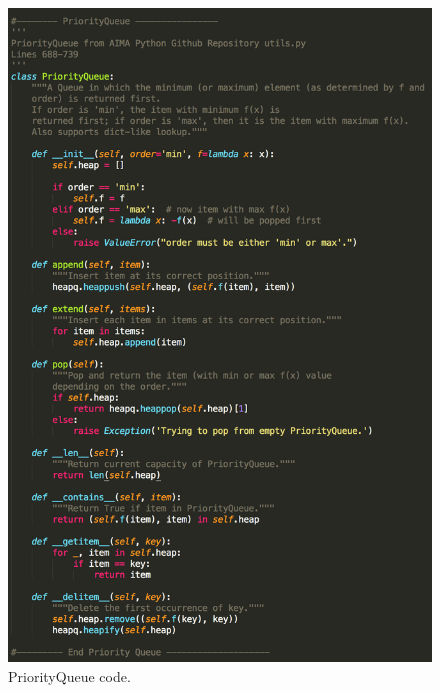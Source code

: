 \documentclass[12pt, letter]{article}
\begin{document}
\begin{figure}[htb]
  \centering
  \includegraphics[width=0.9 \textwidth]{./graphs/priority_queue.png}
  \caption{PriorityQueue code.}
\end{figure}

\FloatBarrier 
\end{document}
